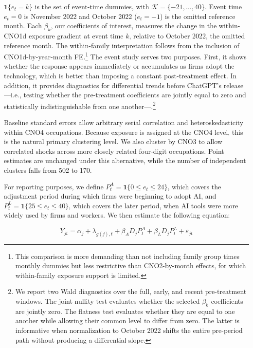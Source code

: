 \documentclass[11pt]{article}
\begin{document}
\(\mathbf{1}\{e_t=k\}\) is the set of event-time dummies, with \(\mathcal{K}=\{-21,\ldots,40\}\). Event time \(e_t=0\) is November 2022 and October 2022 (\(e_t=-1\)) is the omitted reference month. Each \(\beta_k\), our coefficients of interest, measures the change in the within-CNO1d exposure gradient at event time \(k\), relative to October 2022, the omitted reference month. The within-family interpretation follows from the inclusion of CNO1d-by-year-month FE.\footnote{This comparison is more demanding than not including family group times monthly dummies but less restrictive than CNO2-by-month effects, for which within-family exposure support is limited.} The event study serves two purposes. First, it shows whether the response appears immediately or accumulates as firms adopt the technology, which is better than imposing a constant post-treatment effect. In addition, it provides diagnostics for differential trends before ChatGPT's release---i.e., testing whether the pre-treatment coefficients are jointly equal to zero and statistically indistinguishable from one another---.\footnote{We report two Wald diagnostics over the full, early, and recent pre-treatment windows. The joint-nullity test evaluates whether the selected \(\beta_k\) coefficients are jointly zero. The flatness test evaluates whether they are equal to one another while allowing their common level to differ from zero. The latter is informative when normalization to October 2022 shifts the entire pre-period path without producing a differential slope.}

Baseline standard errors allow arbitrary serial correlation and heteroskedasticity within CNO4 occupations. Because exposure is assigned at the CNO4 level, this is the natural primary clustering level. We also cluster by CNO3 to allow correlated shocks across more closely related four-digit occupations. Point estimates are unchanged under this alternative, while the number of independent clusters falls from 502 to 170.

For reporting purposes, we define \(P^A_t=\mathbf{1}\{0\leq e_t\leq24\}\), which covers the adjustment period during which firms were beginning to adopt AI, and \(P^L_t=\mathbf{1}\{25\leq e_t\leq40\}\), which covers the later period, when AI tools were more widely used by firms and workers. We then estimate the following equation:

\begin{equation}
Y_{jt}=\alpha_j+\lambda_{g(j),t}+\beta_A D_jP^A_t+\beta_L D_jP^L_t+\varepsilon_{jt}
\label{eq:baseline_static}
\end{equation}
\end{document}
